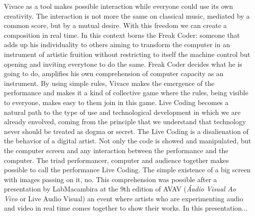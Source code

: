 \documentclass[letterpaper, 12pt]{article}
\begin{document}
Vivace as a tool makes possible interaction while everyone could use its own creativity. The interaction is not more the same on classical music, mediated by a common score, but by a mutual desire. With this freedom we can create a composition in real time. In this context borns the Freak Coder: someone that adds up his individuality to others aiming to transform the computer in an instrument of artistic fruition without restricting to itself the machine control but opening and inviting everytone to do the same. Freak Coder decides what he is going to do, amplifies his own comprehension of computer capacity as an instrument. By using simple rules, Vivace makes the emergence of the performance and makes it a kind of collective game where the rules, being visible to everyone, makes easy to them join in this game.
Live Coding becomes a natural path to the type of use and technological development in which we are already envolved, coming from the principle that we understand that technology never should be treated as dogma or secret. The Live Coding is a disalienation of the behavior of a digital artist. Not only the code is showed and manipulated, but the computer screen and any interaction between the performance and the computer. The triad performancer, computer and audience together makes possible to call the performance Live Coding. The simple existence of a big screen with images passing on it, no.
This comprehension was possible after a presentation by LabMacambira at the 9th edition of AVAV (\textit{\'{A}udio Visual Ao Vivo} or Live Audio Visual) an event where artists who are experimenting audio and video in real time comes together to show their works. In this presentation...
\end{document}
